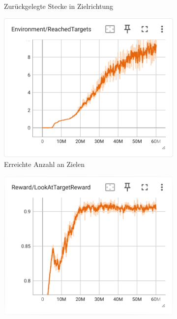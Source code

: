 \begin{figure}[H]
\begin{subfigure}{.49\textwidth}
      \caption{Zurückgelegte Stecke in Zielrichtung}
      \label{fig:106_move_target_dir}
    \end{subfigure}
    \begin{subfigure}{.49\textwidth}
      \centering  
      \includegraphics[width=\textwidth]{img/106_reach_target}
      \caption{Erreichte Anzahl an Zielen}
      \label{fig:106_reach_target}
    \end{subfigure}
    \begin{subfigure}{.49\textwidth}
      \centering  
      \includegraphics[width=\textwidth]{img/106_look_reward}

\end{subfigure}
\end{figure}
